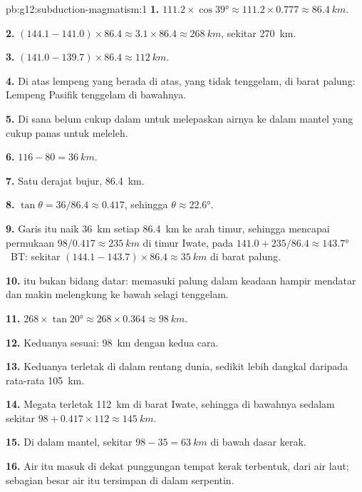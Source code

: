 \begin{solution}{pb:g12:subduction-magmatism:1}
\textbf{1.} $111.2 \times \cos\ang{39} \approx 111.2 \times 0.777 \approx
\qty{86.4}{km}$.

\textbf{2.} $(144.1 - 141.0) \times 86.4 \approx 3.1 \times 86.4 \approx
\qty{268}{km}$, sekitar \qty{270}{km}.

\textbf{3.} $(141.0 - 139.7) \times 86.4 \approx \qty{112}{km}$.

\textbf{4.} Di atas lempeng yang berada di atas, yang tidak tenggelam, di barat
palung: Lempeng Pasifik tenggelam di bawahnya.

\textbf{5.} Di sana  belum cukup dalam untuk melepaskan airnya ke
dalam mantel yang cukup panas untuk meleleh.

\textbf{6.} $116 - 80 = \qty{36}{km}$.

\textbf{7.} Satu derajat bujur, \qty{86.4}{km}.

\textbf{8.} $\tan\theta = 36/86.4 \approx 0.417$, sehingga $\theta \approx
\ang{22.6}$.

\textbf{9.} Garis itu naik \qty{36}{km} setiap \qty{86.4}{km} ke arah timur,
sehingga mencapai permukaan $98/0.417 \approx \qty{235}{km}$ di timur Iwate, pada
$141.0 + 235/86.4 \approx \ang{143.7}$~BT: sekitar $(144.1 - 143.7) \times 86.4
\approx \qty{35}{km}$ di barat palung.

\textbf{10.}  itu bukan bidang datar:  memasuki palung dalam
keadaan hampir mendatar dan makin melengkung ke bawah selagi tenggelam.

\textbf{11.} $268 \times \tan\ang{20} \approx 268 \times 0.364 \approx
\qty{98}{km}$.

\textbf{12.} Keduanya sesuai: \qty{98}{km} dengan kedua cara.

\textbf{13.} Keduanya terletak di dalam rentang dunia, sedikit lebih dangkal
daripada rata-rata \qty{105}{km}.

\textbf{14.} Megata terletak \qty{112}{km} di barat Iwate, sehingga 
di bawahnya sedalam sekitar $98 + 0.417 \times 112 \approx \qty{145}{km}$.

\textbf{15.} Di dalam mantel, sekitar $98 - 35 = \qty{63}{km}$ di bawah dasar
kerak.

\textbf{16.} Air itu masuk di dekat punggungan tempat kerak terbentuk, dari air
laut; sebagian besar air itu tersimpan di dalam serpentin.


\end{solution}
